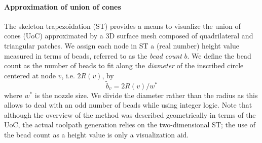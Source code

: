 


\paragraph{Approximation of union of cones}
The skeleton trapezoidation (ST) provides a means to visualize the union of cones (UoC) approximated by a 3D surface mesh composed of quadrilateral and triangular patches.
We assign each node in ST a (real number) height value measured in terms of beads, referred to as the \emph{bead count} $b$.
We define the bead count as the number of beads to fit along the \emph{diameter} of the inscribed circle centered at node $v$, i.e. $2R(v)$, by
\begin{equation}
    \tilde{b}_v = 2 R(v) / w^*
\label{eq:initialBeadCount}
\end{equation}
where $w^*$ is the nozzle size. 
We divide the diameter rather than the radius as this allows to deal with an odd number of beads while using integer logic.
Note that although the overview of the method was described geometrically in terms of the UoC, the actual toolpath generation relies on the two-dimensional ST;
the use of the bead count as a height value is only a visualization aid.







